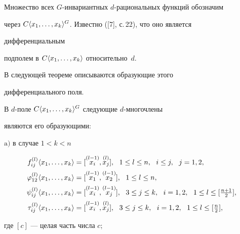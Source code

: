 Множество всех $G$-инвариантных $d$-рациональных функций обозначим 


через $C\langle x_1,\dotsc,x_k\rangle^G$. Известно ([7], с.\,22), что оно является 


дифференциальным 


подполем в $C\langle x_1,\dotsc,x_k\rangle$ относительно~$d$.





В следующей теореме описываются образующие этого 


дифференциального поля. 





\begin{thm}


В $d$-поле $C\langle x_1,\dotsc,x_k\rangle^G$ следующие $d$-многочлены


являются его образующими$:$





$\mathrm a)$ в случае $1<k<n$


\begin{equation}


\begin{split}


f^{(l)}_{i j}\la x_1,\dotsc,x_k\ra&=


[\up{(l-1)}{x_i},\up{(l)}{x_j}],\ \ 1\le l\le n,


\ \ i\le j,\ \ j=1,2,\\


\varphi^{(l)}_{12}\la x_1,\dotsc,x_k\ra&=


[\up{(l-1)}{x_1},\up{(l-1)}{x_2}],\ \ 1\le l\le n, \\


\psi^{(l)}_{i j}\la x_1,\dotsc,x_k\ra &=


[\up{(l-1)}{x_i},\up{(l-1)}{x_j}],\ \ 3\le j\le k, \ \ 


i=1,2,\ \ 1\le l\le [\tfrac{n+1}{2}], \\


\tau^{(l)}_{i j}\la x_1,\dotsc,x_k\ra &=


[\up{(l-1)}{x_i},\up{(l)}{x_j}],\ \ 3\le j\le k,


\ \ i=1,2,\ \ 1\le l\le [\tfrac{n}{2}],


\end{split}


\end{equation}


где $[c]$ --- целая часть числа $c;$ 






\end{thm}
